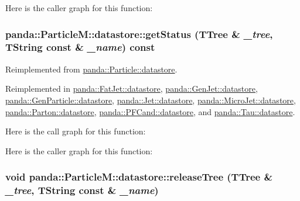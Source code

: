 Here is the caller graph for this function:\hypertarget{structpanda_1_1ParticleM_1_1datastore_a4069b8cdca5715ed6faf0a7907ea8386}{
\subsubsection[{getStatus}]{ panda::ParticleM::datastore::getStatus (TTree \& {\em \_\-tree}, \/  TString const \& {\em \_\-name}) const}}
\label{structpanda_1_1ParticleM_1_1datastore_a4069b8cdca5715ed6faf0a7907ea8386}


Reimplemented from \hyperlink{structpanda_1_1Particle_1_1datastore_a09e5a80068f06d0d2118c2596258b8e3}{panda::Particle::datastore}.

Reimplemented in \hyperlink{structpanda_1_1FatJet_1_1datastore_a83669574414333b1656878e0ec09c345}{panda::FatJet::datastore}, \hyperlink{structpanda_1_1GenJet_1_1datastore_a38a95477762b562ae4a6f2487e2c26ff}{panda::GenJet::datastore}, \hyperlink{structpanda_1_1GenParticle_1_1datastore_af83451f0c94efe8daeb7769571e81aef}{panda::GenParticle::datastore}, \hyperlink{structpanda_1_1Jet_1_1datastore_ac3a9ecd013ec5d5bf94f71ff013e5491}{panda::Jet::datastore}, \hyperlink{structpanda_1_1MicroJet_1_1datastore_ae893cdc52ad9ae8ffc8a8cea1cac1377}{panda::MicroJet::datastore}, \hyperlink{structpanda_1_1Parton_1_1datastore_af82916b07ec783b268c2491cd5b374be}{panda::Parton::datastore}, \hyperlink{structpanda_1_1PFCand_1_1datastore_a117b3a740a7d57118a35816456118685}{panda::PFCand::datastore}, and \hyperlink{structpanda_1_1Tau_1_1datastore_af6634c2974f07bafef20c5a49dfd4050}{panda::Tau::datastore}.

Here is the call graph for this function:

Here is the caller graph for this function:\hypertarget{structpanda_1_1ParticleM_1_1datastore_ad6986990fa55f1c6ca4e92db28486922}{
\subsubsection[{releaseTree}]{\setlength{\rightskip}{0pt plus 5cm}void panda::ParticleM::datastore::releaseTree (TTree \& {\em \_\-tree}, \/  TString const \& {\em \_\-name})}}
\label{structpanda_1_1ParticleM_1_1datastore_ad6986990fa55f1c6ca4e92db28486922}



